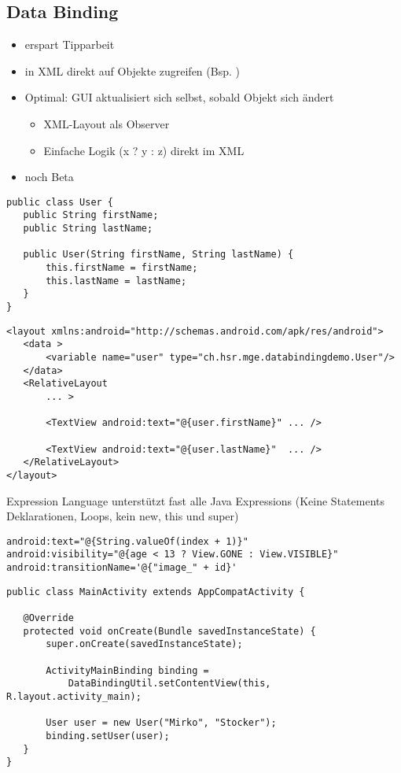 \subsection{Data Binding}
\begin{itemize}
\item erspart Tipparbeit
\item in XML direkt auf Objekte zugreifen (Bsp. )
\item Optimal: GUI aktualisiert sich selbst, sobald Objekt sich ändert
\begin{itemize}
\item XML-Layout als Observer
\item Einfache Logik (x ? y : z) direkt im XML
\end{itemize}
\item noch Beta
\end{itemize}
\begin{lstlisting}
public class User {
   public String firstName;
   public String lastName;

   public User(String firstName, String lastName) {
       this.firstName = firstName;
       this.lastName = lastName;
   }
}
\end{lstlisting}
\begin{lstlisting}
<layout xmlns:android="http://schemas.android.com/apk/res/android">
   <data >
       <variable name="user" type="ch.hsr.mge.databindingdemo.User"/>
   </data>
   <RelativeLayout
       ... >

       <TextView android:text="@{user.firstName}" ... />

       <TextView android:text="@{user.lastName}"  ... />
   </RelativeLayout>
</layout>
\end{lstlisting}
Expression Language unterstützt fast alle Java Expressions (Keine Statements Deklarationen, Loops, kein new, this und super)
\begin{lstlisting}
android:text="@{String.valueOf(index + 1)}"
android:visibility="@{age < 13 ? View.GONE : View.VISIBLE}"
android:transitionName='@{"image_" + id}'
\end{lstlisting}
\begin{lstlisting}
public class MainActivity extends AppCompatActivity {

   @Override
   protected void onCreate(Bundle savedInstanceState) {
       super.onCreate(savedInstanceState);

       ActivityMainBinding binding = 
           DataBindingUtil.setContentView(this, R.layout.activity_main);

       User user = new User("Mirko", "Stocker");
       binding.setUser(user);
   }
}
\end{lstlisting}
